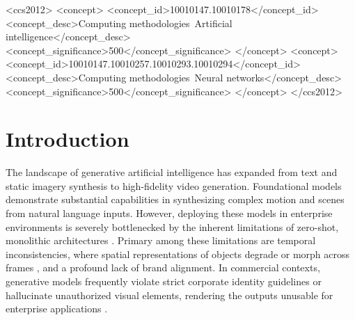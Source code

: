 \documentclass[sigconf,authordraft]{acmart}
\begin{document}
\begin{CCSXML}
<ccs2012>
   <concept>
       <concept_id>10010147.10010178</concept_id>
       <concept_desc>Computing methodologies~Artificial intelligence</concept_desc>
       <concept_significance>500</concept_significance>
       </concept>
   <concept>
       <concept_id>10010147.10010257.10010293.10010294</concept_id>
       <concept_desc>Computing methodologies~Neural networks</concept_desc>
       <concept_significance>500</concept_significance>
       </concept>
 </ccs2012>
\end{CCSXML}



\maketitle

\section{Introduction}

The landscape of generative artificial intelligence has expanded from text and static imagery synthesis to high-fidelity video generation. Foundational models \cite{brooks2024video, deepmind2024veo} demonstrate substantial capabilities in synthesizing complex motion and scenes from natural language inputs. However, deploying these models in enterprise environments is severely bottlenecked by the inherent limitations of zero-shot, monolithic architectures \cite{zaharia2024shift}. Primary among these limitations are temporal inconsistencies, where spatial representations of objects degrade or morph across frames \cite{blattmann2024temporal}, and a profound lack of brand alignment. In commercial contexts, generative models frequently violate strict corporate identity guidelines or hallucinate unauthorized visual elements, rendering the outputs unusable for enterprise applications \cite{ji2023survey}.
\end{document}
